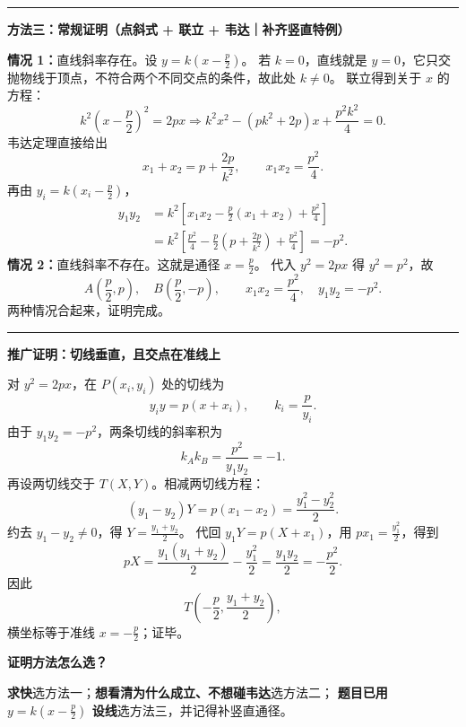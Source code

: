\begin{proofbox}
\medskip\hrule\medskip
\textbf{\textcolor{CProof}{方法三：常规证明（点斜式 + 联立 + 韦达｜补齐竖直特例）}}\par\smallskip
\textbf{情况 1：}直线斜率存在。设 $y=k(x-\frac p2)$。
若 $k=0$，直线就是 $y=0$，它只交抛物线于顶点，不符合两个不同交点的条件，故此处 $k\ne0$。
联立得到关于 $x$ 的方程：
\[
 k^2\left(x-\frac p2\right)^2=2px
 \Longrightarrow
 k^2x^2-(pk^2+2p)x+\frac{p^2k^2}{4}=0.
\]
韦达定理直接给出
\[
 x_1+x_2=p+\frac{2p}{k^2},\qquad
 \boxed{x_1x_2=\frac{p^2}{4}}.
\]
再由 $y_i=k(x_i-\frac p2)$，
\[
 \begin{aligned}
 y_1y_2&=k^2\left[x_1x_2-\frac p2(x_1+x_2)+\frac{p^2}{4}\right]\\
 &=k^2\left[\frac{p^2}{4}-\frac p2\left(p+\frac{2p}{k^2}\right)+\frac{p^2}{4}\right]
 =\boxed{-p^2}.
 \end{aligned}
\]
\textbf{情况 2：}直线斜率不存在。这就是通径 $x=\frac p2$。
代入 $y^2=2px$ 得 $y^2=p^2$，故
\[
 A\!\left(\frac p2,p\right),\quad
 B\!\left(\frac p2,-p\right),\qquad
 x_1x_2=\frac{p^2}{4},\quad y_1y_2=-p^2.
\]
两种情况合起来，证明完成。

\medskip\hrule\medskip
\textbf{\textcolor{CProof}{推广证明：切线垂直，且交点在准线上}}\par\smallskip
对 $y^2=2px$，在 $P(x_i,y_i)$ 处的切线为
\[
 y_iy=p(x+x_i),\qquad k_i=\frac p{y_i}.
\]
由于 $y_1y_2=-p^2$，两条切线的斜率积为
\[
 \boxed{k_Ak_B=\frac{p^2}{y_1y_2}=-1}.
\]
再设两切线交于 $T(X,Y)$。相减两切线方程：
\[
 (y_1-y_2)Y=p(x_1-x_2)
 =\frac{y_1^2-y_2^2}{2}.
\]
约去 $y_1-y_2\ne0$，得 $Y=\frac{y_1+y_2}{2}$。
代回 $y_1Y=p(X+x_1)$，用 $px_1=\frac{y_1^2}{2}$，得到
\[
 pX=\frac{y_1(y_1+y_2)}{2}-\frac{y_1^2}{2}
 =\frac{y_1y_2}{2}=-\frac{p^2}{2}.
\]
因此
\[
 \boxed{T\!\left(-\frac p2,\frac{y_1+y_2}{2}\right)},
\]
横坐标等于准线 $x=-\frac p2$；证毕。

\medskip
\textbf{\textcolor{CProof}{证明方法怎么选？}}\par\smallskip
\textbf{求快}选方法一；\textbf{想看清为什么成立、不想碰韦达}选方法二；
\textbf{题目已用 $y=k(x-\frac p2)$ 设线}选方法三，并记得补竖直通径。
\end{proofbox}
